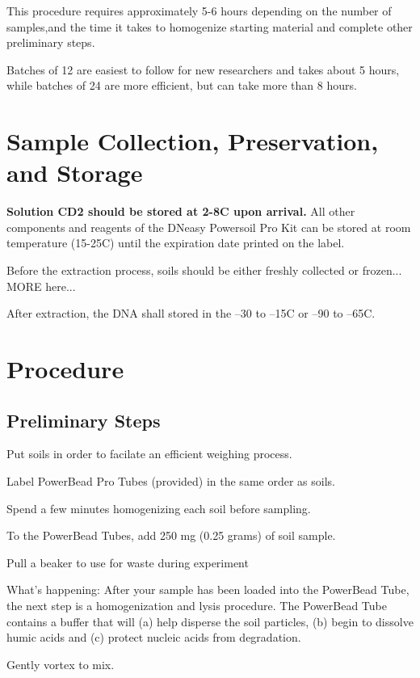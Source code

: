 \documentclass[12pt]{SOP5_beta}\usepackage[]{graphicx}\usepackage[]{xcolor}
\begin{document}
\NP This procedure requires approximately 5-6 hours depending on the number of samples,and the time it takes to homogenize starting material and complete other preliminary steps.

\NP Batches of 12 are easiest to follow for new researchers and takes about 5 hours, while batches of 24 are more efficient, but can take more than 8 hours.

\section{Sample Collection, Preservation, and Storage}

\NP \textbf{Solution CD2 should be stored at 2-8\degree C upon arrival.} All other components and reagents of the DNeasy Powersoil Pro Kit can be stored at room temperature (15-25\degree C) until the expiration date printed on the label.

\NP Before the extraction process, soils should be either freshly collected or frozen... MORE here...

\NP After extraction, the DNA shall stored in the  –30 to –15\degree C or –90 to –65\degree C.

\section{Procedure}

\subsection*{Preliminary Steps} 
 
\NP Put soils in order to facilate an efficient weighing process. 

\NP Label PowerBead Pro Tubes (provided) in the same order as soils.

\NP Spend a few minutes homogenizing each soil before sampling.

\NP To the PowerBead Tubes, add 250 mg (0.25 grams) of soil sample.

\NP Pull a beaker to use for waste during experiment

\noindent What's happening: After your sample has been loaded into the PowerBead Tube, the next step is a homogenization and lysis procedure. The PowerBead
Tube contains a buffer that will (a) help disperse the soil particles, (b) begin to dissolve humic acids and (c) protect nucleic acids from degradation.

\NP Gently vortex to mix.
\end{document}
